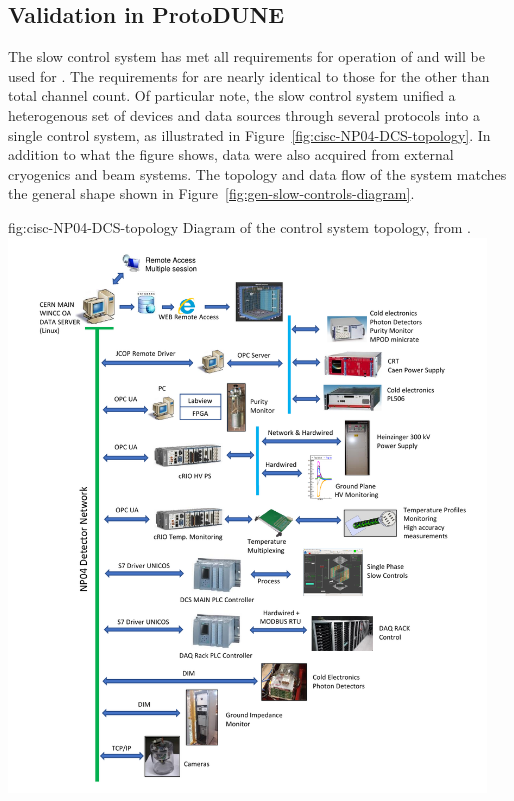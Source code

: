 \subsection{Validation in ProtoDUNE}
\label{sec:cisc-slow-control-pdsp}

The  slow control system has met
all requirements for operation of \cite{pdspdcs_proc} and will be used for .  The requirements for  are
nearly identical to those for the  other than
total channel count. Of particular note, the  slow control system unified a heterogenous set of devices and data sources
through several protocols into a
single control system, as illustrated in
Figure~\ref{fig:cisc-NP04-DCS-topology}. In addition to what
the figure shows, data were also acquired from external cryogenics and beam
systems.  The topology and data flow of the system matches the general
shape shown in Figure~\ref{fig:gen-slow-controls-diagram}.

\begin{dunefigure}{fig:cisc-NP04-DCS-topology}
{Diagram of the  control system topology, from \cite{pdspdcs_proc}.}
\includegraphics[height=0.9\textheight,width=0.95\textwidth,keepaspectratio]{graphics/NP04-DCS_arch_vert}
\end{dunefigure}


